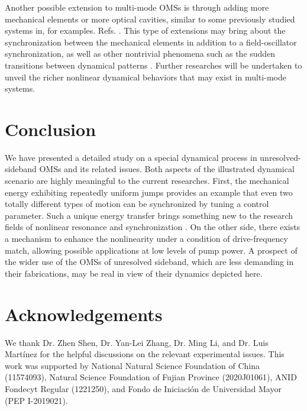 \documentclass[a4paper,fleqn]{cas-dc}
\begin{document}
Another possible extension to multi-mode OMSs is through adding more mechanical elements or more optical cavities, similar to some previously studied systems in, for examples. Refs. \cite{bhattacharya2008multiple, metzger2008self,lin2010coherent,nielsen2017multimode, chen2017entanglement, wang2019breaking, lai2020nonreciprocal,kohler2020simultaneous,lai2020tunable,xie2020pt,lai2021significant,chen2022cooling,lai2022noise,lai2022tripartite}. This type of extensions may bring about the synchronization between the mechanical elements \cite{colombano2019synchronization, sheng2020self, wang2021passive} in addition to a field-oscillator synchronization, as well as other nontrivial phenomena such as the sudden transitions between dynamical patterns \cite{lin2021catastrophic}. Further researches will be undertaken to unveil the richer nonlinear dynamical behaviors that may exist in multi-mode systems. 

\section{Conclusion}
We have presented a detailed study on a special dynamical process in unresolved-sideband OMSs and its related issues.
Both aspects of the illustrated dynamical scenario are highly meaningful to the current researches. First, the mechanical energy exhibiting repeatedly uniform jumps provides an example that even two totally different types of motion can be synchronized by tuning a control parameter. Such a unique energy transfer brings something new to the research fields of nonlinear resonance \cite{rajasekar2016nonlinear} and synchronization \cite{pikovsky2002synchronization,boccaletti2018synchronization}. On the other side, there exists a mechanism to enhance the nonlinearity under a condition of drive-frequency match, allowing possible applications at low levels of pump power. A prospect of the wider use of the OMSs of unresolved sideband, which are less demanding in their fabrications, may be real in view of their dynamics depicted here.  



\section*{Acknowledgements}

We thank Dr. Zhen Shen, Dr. Yan-Lei Zhang, Dr. Ming Li, and Dr. Luis Mart\'{i}nez for the helpful discussions on the relevant experimental issues. This work was supported by National Natural Science Foundation of China (11574093), Natural Science Foundation of Fujian Province (2020J01061), ANID Fondecyt Regular (1221250), and Fondo de Iniciaci\'{o}n de Universidad Mayor (PEP I-2019021).



% 



%

\end{document}
